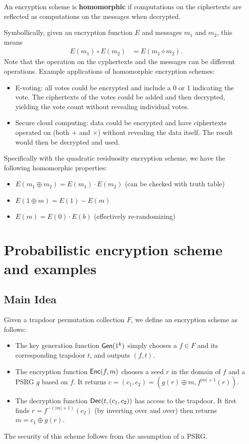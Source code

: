 \documentclass[10pt]{article}
\begin{document}
\begin{definition}An encryption scheme is \textbf{homomorphic} if computations on the ciphertexts are reflected as computations on the messages when decrypted.\end{definition}

Symbollically, given an encryption function $E$ and messages $m_1$ and $m_2$, this means
\begin{align*}
E(m_1) \circ E(m_2) &= E(m_1 \diamond m_2).
\end{align*}
Note that the operation on the cyphertexts and the messages can be different operations. Example applications of homomorphic encryption schemes:
\begin{itemize}
	\item E-voting: all votes could be encrypted and include a 0 or 1 indicating the vote. The ciphertexts of the votes could be added and then decrypted, yielding the vote count without revealing individual votes.
	\item Secure cloud computing: data could be encrypted and have ciphertexts operated on (both $+$ and $\times$) without revealing the data itself. The result would then be decrypted and used.
\end{itemize}
Specifically with the quadratic residuosity encryption scheme, we have the following homomorphic properties:
\begin{itemize}
	\item $E(m_1 \oplus m_2) = E(m_1) \cdot E(m_2)$ (can be checked with truth table)
	\item $E(1 \oplus m) = E(1) - E(m)$
	\item $E(m) = E(0) \cdot E(b)$ (effectively re-randomizing)
\end{itemize}





\section{Probabilistic encryption scheme and examples}

\subsection{Main Idea}

Given a trapdoor permutation collection $F$, we define an encryption scheme as follows:
\begin{itemize}
	\item The key generation function $\mathsf{Gen}(1^k)$ simply chooses a $f\in F$ and its corresponding trapdoor $t$, and outputs $(f, t)$.
	\item The encryption function $\mathsf{Enc}(f, m)$ chooses a seed $r$ in the domain of $f$ and a PSRG $g$ based on $f$. It returns $c = (c_1, c_2) = (g(r)\oplus m, f^{|m|+1}(r))$.
	\item The decryption function $\mathsf{Dec}(t, (c_1, c_2))$ has access to the trapdoor. It first finds $r = f^{-(|m|+1)}(c_2)$ (by inverting over and over) then returns $m=c_1 \oplus g(r)$.
\end{itemize}
The security of this scheme follows from the assumption of a PSRG.
\end{document}
